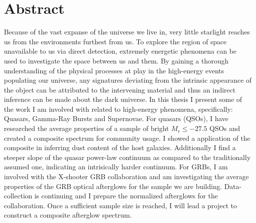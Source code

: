 %
\chapter*{Abstract}
\label{sec:abstract}
\vspace*{-10mm}

Because of the vast expanse of the universe we live in, very little starlight reaches us from the environments furthest from us. To explore the region of space unavailable to us via direct detection, extremely energetic phenomena can be used to investigate the space between us and them. By gaining a thorough understanding of the physical processes at play in the high-energy events populating our universe,  any signatures deviating from the intrinsic appearance of the object can be attributed to the intervening material and thus an indirect inference can be made about the dark universe. In this thesis I present some of the work I am involved with related to high-energy phenomena, specifically: Quasars, Gamma-Ray Bursts and Supernovae. For quasars (QSOs), I have researched the average properties of a sample of bright $M_{r} \leq -27.5$ QSOs and created a composite spectrum for community usage. I showed a application of the composite in inferring dust content of the host galaxies. Additionally I find a steeper slope of the quasar power-law continuum as compared to the traditionally assumed one, indicating an intrisically harder continuum. For GRBs, I am involved with the X-shooter GRB collaboration and am investigating the average properties of the GRB optical afterglows for the sample we are building. Data-collection is continuing and I prepare the normalized afterglows for the collaboration. Once a sufficient sample size is reached, I will lead a project to construct a composite afterglow spectrum. 
